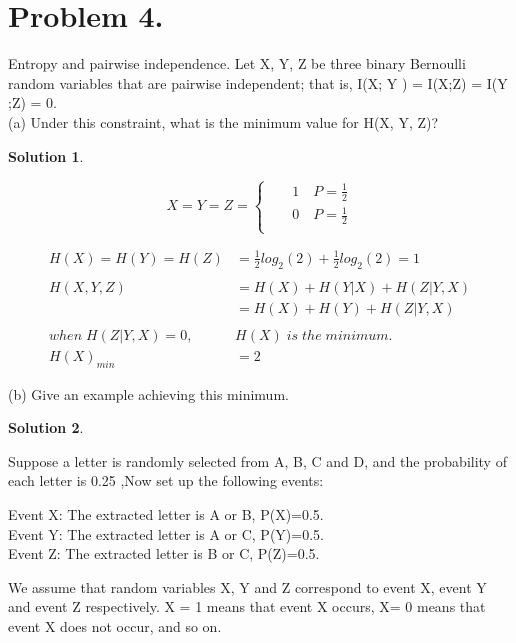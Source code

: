 \documentclass[UTF8,oneside]{article}
\newtheorem*{Solution}{Solution}
\begin{document}
\section*{Problem 4.}
Entropy and pairwise independence. Let X, Y, Z be three binary Bernoulli random variables that are pairwise independent; that is, I(X; Y ) = I(X;Z) = I(Y ;Z) = 0.\\
(a) Under this constraint, what is the minimum value for H(X, Y, Z)?
\begin{Solution}
\end{Solution}
$$ X=Y=Z=\left\{
\begin{aligned}
 & & 1 \quad P= \frac{1}{2}\\
 & & 0 \quad P= \frac{1}{2}\\
\end{aligned}
\right.
$$
\begin{center}
\begin{align*}
H(X)=H(Y)=H(Z)&=\frac{1}{2}log_2(2)+\frac{1}{2}log_2(2)=1\\
\\
H(X,Y,Z)&=H(X)+H(Y|X)+H(Z|Y,X)\\
&=H(X)+H(Y)+H(Z|Y,X)\\
\\
when\;H(Z|Y,X)=0,\;\;&H(X)\; is\; the\; minimum.\\
H(X)_{min}&=2

\end{align*}
\end{center}
(b) Give an example achieving this minimum.
\begin{Solution}
\end{Solution}
Suppose a letter is randomly selected from A, B, C and D, and the probability of each letter is 0.25 ,Now set up the following events:\\
\begin{center}
Event X: The extracted letter is A or B, \quad P(X)=0.5.\\
Event Y: The extracted letter is A or C, \quad P(Y)=0.5.\\
Event Z: The extracted letter is B or C, \quad P(Z)=0.5.\\
\end{center}
We assume that random variables X, Y and Z correspond to event X, event Y and event Z respectively. X = 1 means that event X occurs, X= 0 means that event X does not occur, and so on.
\end{document}
